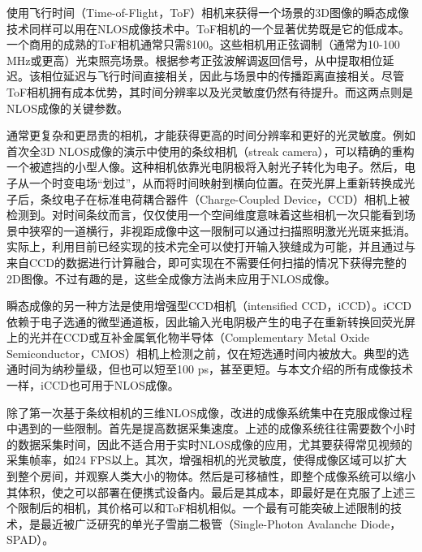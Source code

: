 \documentclass[master]{shtthesis}             %
\begin{document}
使用飞行时间（Time-of-Flight，ToF）相机来获得一个场景的3D图像的瞬态成像技术同样可以用在NLOS成像技术中\citep{kadambi2013coded,kadambi2013coded,peters2015solving}。ToF相机的一个显著优势既是它的低成本。一个商用的成熟的ToF相机通常只需\$100。这些相机用正弦调制（通常为10-100 MHz或更高）光束照亮场景。根据参考正弦波解调返回信号，从中提取相位延迟。该相位延迟与飞行时间直接相关，因此与场景中的传播距离直接相关\citep{jarabo2017recent}。尽管ToF相机拥有成本优势，其时间分辨率以及光灵敏度仍然有待提升。而这两点则是NLOS成像的关键参数。

通常更复杂和更昂贵的相机，才能获得更高的时间分辨率和更好的光灵敏度。例如首次全3D NLOS成像的演示中使用的条纹相机（streak camera），可以精确的重构一个被遮挡的小型人像\citep{Velten2012}。这种相机依靠光电阴极将入射光子转化为电子。然后，电子从一个时变电场“划过”，从而将时间映射到横向位置。在荧光屏上重新转换成光子后，条纹电子在标准电荷耦合器件（Charge-Coupled Device，CCD）相机上被检测到。对时间条纹而言，仅仅使用一个空间维度意味着这些相机一次只能看到场景中狭窄的一道横行，非视距成像中这一限制可以通过扫描照明激光光斑来抵消\citep{velten2013femto}。实际上，利用目前已经实现的技术完全可以使打开输入狭缝成为可能，并且通过与来自CCD的数据进行计算融合，即可实现在不需要任何扫描的情况下获得完整的2D图像\citep{gao2014single,mikami2016ultrafast,zhu2016space}。不过有趣的是，这些全成像方法尚未应用于NLOS成像。

瞬态成像的另一种方法是使用增强型CCD相机（intensified CCD，iCCD）。iCCD依赖于电子选通的微型通道板，因此输入光电阴极产生的电子在重新转换回荧光屏上的光并在CCD或互补金属氧化物半导体（Complementary Metal Oxide Semiconductor，CMOS）相机上检测之前，仅在短选通时间内被放大。典型的选通时间为纳秒量级，但也可以短至100 ps，甚至更短。与本文介绍的所有成像技术一样，iCCD也可用于NLOS成像\citep{laurenzis2014nonline}。

除了第一次基于条纹相机的三维NLOS成像，改进的成像系统集中在克服成像过程中遇到的一些限制。首先是提高数据采集速度。上述的成像系统往往需要数个小时的数据采集时间，因此不适合用于实时NLOS成像的应用，尤其要获得常见视频的采集帧率，如24 FPS以上\citep{read2000restoration}。其次，增强相机的光灵敏度，使得成像区域可以扩大到整个房间，并观察人类大小的物体。然后是可移植性，即整个成像系统可以缩小其体积，使之可以部署在便携式设备内。最后是其成本，即最好是在克服了上述三个限制后的相机，其价格可以和ToF相机相似。一个最有可能突破上述限制的技术，是最近被广泛研究的单光子雪崩二极管（Single-Photon Avalanche Diode，SPAD）。
\end{document}
